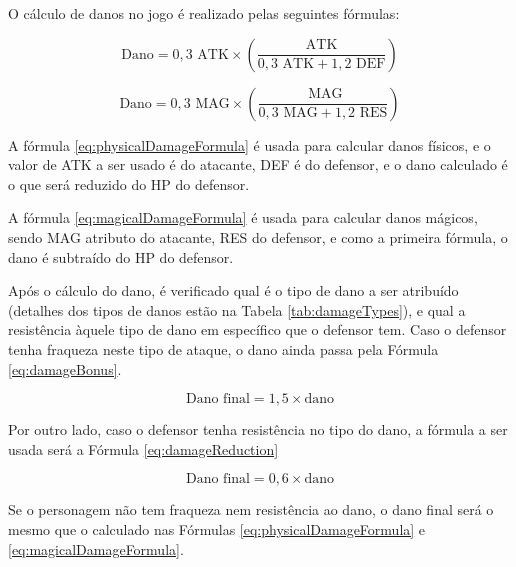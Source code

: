 \documentclass[
	12pt,					%
	openright,				%
	oneside,				%
	a4paper,				%
	bibjustif,				%
	chapter=TITLE,			%
	english,				%
	brazil,					%
	]{abntex2}
\begin{document}
	O cálculo de danos no jogo é realizado pelas seguintes fórmulas:
	
	\begin{equation}
		\textrm{Dano} = 0,3 \textrm{ ATK} \times \left(\frac{\textrm{ATK}}{0,3 \textrm{ ATK} + 1,2 \textrm{ DEF}}\right)
		\label{eq:physicalDamageFormula}
	\end{equation}
	
	\begin{equation}
		\textrm{Dano} = 0,3 \textrm{ MAG} \times \left(\frac{\textrm{ MAG}}{0,3 \textrm{ MAG} + 1,2 \textrm{ RES}}\right)
		\label{eq:magicalDamageFormula}
	\end{equation}
	
	\vspace{3mm}
	
	A fórmula \eqref{eq:physicalDamageFormula} é usada para calcular danos físicos,
	e o valor de ATK a ser usado é do atacante,
	DEF é do defensor,
	e o dano calculado é o que será reduzido do HP do defensor.
	
	A fórmula \eqref{eq:magicalDamageFormula} é usada para calcular danos mágicos,
	sendo MAG atributo do atacante,
	RES do defensor,
	e como a primeira fórmula, o dano é subtraído do HP do defensor.
	
	Após o cálculo do dano,
	é verificado qual é o tipo de dano a ser atribuído
	(detalhes dos tipos de danos estão na Tabela \ref{tab:damageTypes}),
	e qual a resistência àquele tipo de dano em específico que o defensor tem.
	Caso o defensor tenha fraqueza neste tipo de ataque,
	o dano ainda passa pela Fórmula \eqref{eq:damageBonus}.
	
	\begin{equation}
		\textrm{Dano final} = 1,5 \times \textrm{dano}
		\label{eq:damageBonus}
	\end{equation}
	
	\vspace{3mm}
	
	Por outro lado, caso o defensor tenha resistência no tipo do dano,
	a fórmula a ser usada será a Fórmula \eqref{eq:damageReduction}
	
	\begin{equation}
		\textrm{Dano final} = 0,6 \times \textrm{dano}
		\label{eq:damageReduction}
	\end{equation}
	
	\vspace{3mm}
	
	Se o personagem não tem fraqueza nem resistência ao dano,
	o dano final será o mesmo que o calculado nas Fórmulas \eqref{eq:physicalDamageFormula} e \eqref{eq:magicalDamageFormula}.
	
\end{document}

